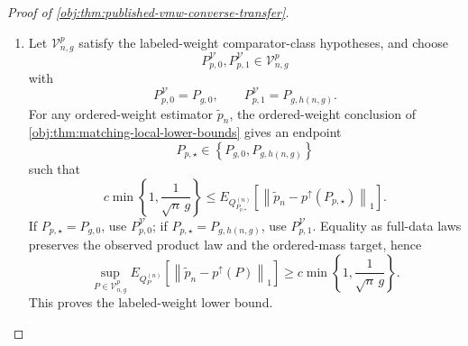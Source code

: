 \documentclass[11pt]{article}
\begin{document}
\begin{proof}[Proof of \cref{obj:thm:published-vmw-converse-transfer}]
\begin{enumerate}
\item Let \(\mathcal V_{n,g}^p\) satisfy the labeled-weight comparator-class hypotheses, and choose
\[
P_{p,0}^{\mathcal V},P_{p,1}^{\mathcal V}\in\mathcal V_{n,g}^p
\]
with
\[
P_{p,0}^{\mathcal V}=P_{g,0},
\qquad
P_{p,1}^{\mathcal V}=P_{g,h(n,g)}.
\]
For any ordered-weight estimator \(\widetilde p_n\), the ordered-weight conclusion of \cref{obj:thm:matching-local-lower-bounds} gives an endpoint
\[
P_{p,\star}\in
\left\{P_{g,0},P_{g,h(n,g)}\right\}
\]
such that
\[
c\min\left\{1,\frac{1}{\sqrt n\,g}\right\}
\le
E_{Q_{P_{p,\star}}^{(n)}}\!\left[
\left\|\widetilde p_n-p^{\uparrow}(P_{p,\star})\right\|_1
\right].
\]
If \(P_{p,\star}=P_{g,0}\), use \(P_{p,0}^{\mathcal V}\); if
\(P_{p,\star}=P_{g,h(n,g)}\), use \(P_{p,1}^{\mathcal V}\).  Equality as full-data laws preserves the observed product law and the ordered-mass target, hence
\[
\sup_{P\in\mathcal V_{n,g}^p}
E_{Q_P^{(n)}}\!\left[
\left\|\widetilde p_n-p^{\uparrow}(P)\right\|_1
\right]
\ge
c\min\left\{1,\frac{1}{\sqrt n\,g}\right\}.
\]
This proves the labeled-weight lower bound. %
\end{enumerate}
\end{proof}
\end{document}
